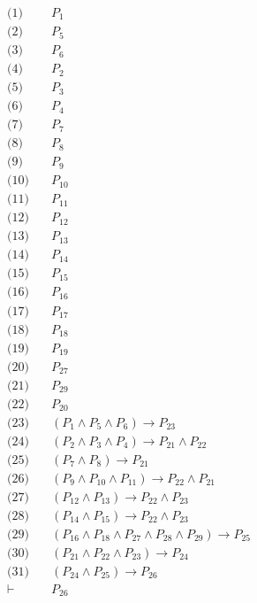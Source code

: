 \documentclass[11pt]{article}
\begin{document}
\begin{align*}
  \text{(1)} \quad & P_{1} \\
  \text{(2)} \quad & P_{5} \\
  \text{(3)} \quad & P_{6} \\
  \text{(4)} \quad & P_{2} \\
  \text{(5)} \quad & P_{3} \\
  \text{(6)} \quad & P_{4} \\
  \text{(7)} \quad & P_{7} \\
  \text{(8)} \quad & P_{8} \\
  \text{(9)} \quad & P_{9} \\
  \text{(10)} \quad & P_{10} \\
  \text{(11)} \quad & P_{11} \\
  \text{(12)} \quad & P_{12} \\
  \text{(13)} \quad & P_{13} \\
  \text{(14)} \quad & P_{14} \\
  \text{(15)} \quad & P_{15} \\
  \text{(16)} \quad & P_{16} \\
  \text{(17)} \quad & P_{17} \\
  \text{(18)} \quad & P_{18} \\
  \text{(19)} \quad & P_{19} \\
  \text{(20)} \quad & P_{27} \\
  \text{(21)} \quad & P_{29} \\
  \text{(22)} \quad & P_{20} \\
  \text{(23)} \quad & (P_{1} \land P_{5} \land P_{6}) \rightarrow P_{23} \\
  \text{(24)} \quad & (P_{2} \land P_{3} \land P_{4}) \rightarrow P_{21} \land P_{22} \\
  \text{(25)} \quad & (P_{7} \land P_{8}) \rightarrow P_{21} \\
  \text{(26)} \quad & (P_{9} \land P_{10} \land P_{11}) \rightarrow P_{22} \land P_{21} \\
  \text{(27)} \quad & (P_{12} \land P_{13}) \rightarrow P_{22} \land P_{23} \\
  \text{(28)} \quad & (P_{14} \land P_{15}) \rightarrow P_{22} \land P_{23} \\
  \text{(29)} \quad & (P_{16} \land P_{18} \land P_{27} \land P_{28} \land P_{29}) \rightarrow P_{25} \\
  \text{(30)} \quad & (P_{21} \land P_{22} \land P_{23}) \rightarrow P_{24} \\
  \text{(31)} \quad & (P_{24} \land P_{25}) \rightarrow P_{26} \\
  \vdash \quad & P_{26}
\end{align*}
\end{document}
